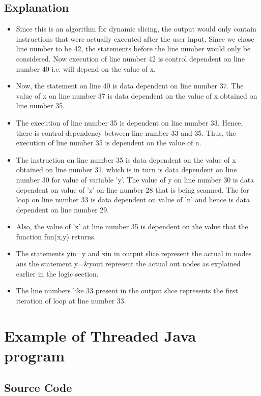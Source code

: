 \documentclass[conference]{IEEEtran}
\begin{document}
\subsection{Explanation}
\begin{itemize}
    \item Since this is an algorithm for dynamic slicing, the output would only contain instructions that were actually executed after the user input. Since we chose line number to be 42, the statements before the line number would only be considered. Now execution of line number 42 is control dependent on line number 40 i.e. will depend on the value of x.
\item Now, the statement on line 40 is data dependent on line number 37. The value of x on line number 37 is data dependent on the value of x obtained on line number 35.

\item The execution of line number 35 is dependent on line number 33. Hence, there is control dependency between line number 33 and 35. Thus, the execution of line number 35 is dependent on the value of n.

\item The instruction on line number 35 is data dependent on the value of x obtained on line number 31. which is in turn is data dependent on line number 30 for value of variable 'y'. The value of y on line number 30 is data dependent on value of 'z' on line number 28 that is being scanned. The for loop on line number 33 is data dependent on value of 'n' and hence is data dependent on line number 29.
\item Also,  the value of 'x' at line number 35 is dependent on the value that the function fun(x,y) returns.
\item The statements y\textunderscore in=y and x\textunderscore in in output slice represent the actual in nodes ans the statement y=\&y\textunderscore out represent the actual out nodes as explained earlier in the logic section. 
\item The line numbers like 33 present in the output slice represents the first iteration of loop at line number 33. 

\end{itemize}

\section{Example of Threaded Java program}
\subsection{Source Code}

\end{document}
